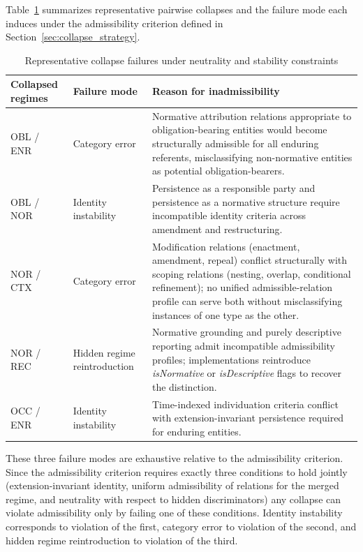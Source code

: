 Table~\ref{tab:collapse_summary} summarizes representative pairwise
collapses and the failure mode each induces under the admissibility
criterion defined in Section~\ref{sec:collapse_strategy}.

\begin{table}[!htb]
\centering
\caption{Representative collapse failures under neutrality and stability constraints}
\label{tab:collapse_summary}
\vspace{1.0em}
\begin{tabular}{@{} p{3.0cm} p{3.5cm} p{5.2cm}@{} }
\hline
\textbf{Collapsed regimes} & \textbf{Failure mode} & \textbf{Reason for inadmissibility} \\
\hline
OBL / ENR
& Category error
& Normative attribution relations appropriate to obligation-bearing entities would become structurally admissible for all enduring referents, misclassifying non-normative entities as potential obligation-bearers. \\
\hline
OBL / NOR
& Identity instability
& Persistence as a responsible party and persistence as a normative structure require incompatible identity criteria across amendment and restructuring. \\
\hline
NOR / CTX
& Category error
& Modification relations (enactment, amendment, repeal) conflict structurally with scoping relations (nesting, overlap, conditional refinement); no unified admissible-relation profile can serve both
without misclassifying instances of one type as the other. \\
\hline
NOR / REC
& Hidden regime reintroduction
& Normative grounding and purely descriptive reporting admit incompatible admissibility profiles; implementations reintroduce \emph{isNormative} or \emph{isDescriptive} flags to recover the distinction. \\
\hline
OCC / ENR
& Identity instability
& Time-indexed individuation criteria conflict with extension-invariant persistence required for enduring entities. \\
\hline
\end{tabular}
\vspace{1.0em}
\end{table}

These three failure modes are exhaustive
relative to the admissibility criterion.
Since the admissibility criterion requires
exactly three conditions to hold jointly
(extension-invariant identity,
uniform admissibility of relations for the merged regime,
and neutrality with respect to hidden discriminators)
any collapse can violate admissibility only by
failing one of these conditions.
Identity instability corresponds to violation of the first,
category error to violation of the second,
and hidden regime reintroduction to violation of the third.


